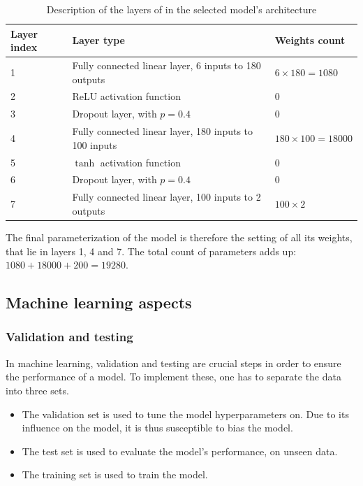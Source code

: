 \begin{table}[h!]
    \centering
    \begin{tabular}{|l|l|l|}
        \hline
        Layer index & Layer type & Weights count \\ \hline
        1 & Fully connected linear layer, 6 inputs to 180 outputs & $6\times 180 = 1080$ \\
        2 & ReLU activation function & 0 \\
        3 & Dropout layer, with $p=0.4$ & 0 \\
        4 & Fully connected linear layer, 180 inputs to 100 inputs & $180\times 100=18000$ \\
        5 & $\tanh$ activation function & 0 \\
        6 & Dropout layer, with $p=0.4$ & 0\\
        7 & Fully connected linear layer, 100 inputs to 2 outputs & $100\times 2$ \\ \hline
    \end{tabular}
    \caption{Description of the layers of in the selected model's architecture}
    \label{tab:nn-layers}
\end{table}

The final parameterization of the model is therefore the setting of all its weights, that lie in layers 1, 4 and 7. The total count of parameters adds up: $1080 + 18000 + 200 = 19280$.

\subsection{Machine learning aspects}

\subsubsection{Validation and testing\label{ssec:val-testing}}

In machine learning, validation and testing are crucial steps in order to ensure the performance of a model. To implement these, one has to separate the data into three sets.

\begin{itemize}
    \item The validation set is used to tune the model hyperparameters on. Due to its influence on the model, it is thus susceptible to bias the model.
    \item The test set is used to evaluate the model's performance, on unseen data.
    \item The training set is used to train the model.
\end{itemize}

